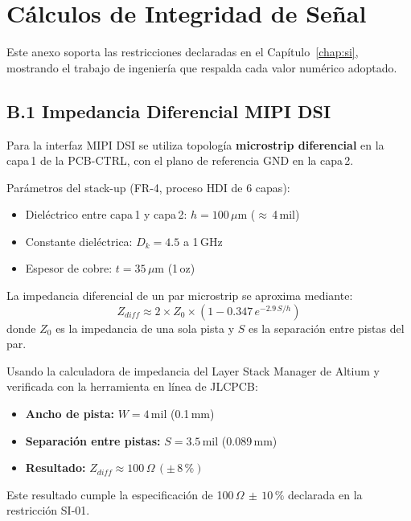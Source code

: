 \chapter{Cálculos de Integridad de Señal}
\label{chap:anexo_si}

Este anexo soporta las restricciones declaradas en el Capítulo~\ref{chap:si},
mostrando el trabajo de ingeniería que respalda cada valor numérico adoptado.

\section*{B.1 Impedancia Diferencial MIPI DSI}

Para la interfaz MIPI DSI se utiliza topología \textbf{microstrip diferencial} en la capa\,1 de la PCB-CTRL, con el plano de referencia GND en la capa\,2.

Parámetros del stack-up (FR-4, proceso HDI de 6 capas):
\begin{itemize}
  \item Dieléctrico entre capa\,1 y capa\,2: $h = 100\,\mu\text{m}$ ($\approx$\,4\,mil)
  \item Constante dieléctrica: $D_k = 4.5$ a 1\,GHz
  \item Espesor de cobre: $t = 35\,\mu\text{m}$ (1\,oz)
\end{itemize}

La impedancia diferencial de un par microstrip se aproxima mediante:
\[
  Z_{diff} \approx 2 \times Z_0 \times \left(1 - 0.347\,e^{-2.9\,S/h}\right)
\]
donde $Z_0$ es la impedancia de una sola pista y $S$ es la separación entre pistas del par.

Usando la calculadora de impedancia del Layer Stack Manager de Altium y verificada con la herramienta en línea de JLCPCB:
\begin{itemize}
  \item \textbf{Ancho de pista:} $W = 4\,\text{mil}$ (0.1\,mm)
  \item \textbf{Separación entre pistas:} $S = 3.5\,\text{mil}$ (0.089\,mm)
  \item \textbf{Resultado:} $Z_{diff} \approx 100\,\Omega\,(\pm\,8\,\%)$
\end{itemize}

Este resultado cumple la especificación de 100\,$\Omega\,\pm\,10\,\%$ declarada en la restricción SI-01.

